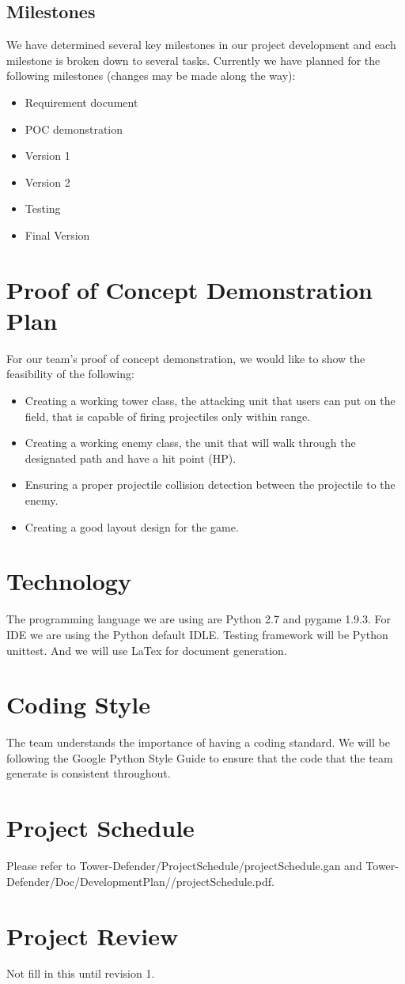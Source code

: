 \documentclass{article}
\begin{document}
\subsection{Milestones}
We have determined several key milestones in our project development and each milestone is broken down to several tasks. Currently we have planned for the following milestones (changes may be made along the way):
\begin{itemize}
    \item Requirement document
    \item POC demonstration
    \item Version 1
    \item Version 2
    \item Testing
    \item Final Version
\end{itemize}

\section{Proof of Concept Demonstration Plan}
For our team’s proof of concept demonstration, we would like to show the feasibility of the following:
\begin{itemize}
    \item Creating a working tower class, the attacking unit that users can put on the field,  that is capable of firing projectiles only within range.
    \item Creating a working enemy class, the unit that will walk through the designated path and have a hit point (HP).
    \item Ensuring a proper projectile collision detection between the projectile to the enemy.
    \item Creating a good layout design for the game.
\end{itemize}

\section{Technology}
The programming language we are using are Python 2.7 and pygame 1.9.3. For IDE we are using the Python default IDLE. Testing framework will be Python unittest. And we will use LaTex for document generation.

\section{Coding Style}
The team understands the importance of having a coding standard. We will be following the Google Python Style Guide to ensure that the code that the team generate is consistent throughout.

\section{Project Schedule}
Please refer to Tower-Defender/ProjectSchedule/projectSchedule.gan and Tower-Defender/Doc/DevelopmentPlan//projectSchedule.pdf.

\section{Project Review}
Not fill in this until revision 1.
\end{document}
